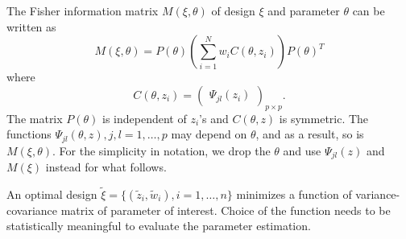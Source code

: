 \documentclass[12pt]{TD-CJS}
\newcommand{\argmin}{\operatornamewithlimits{argmin}}
\begin{document}
The Fisher information matrix $M(\xi,\theta)$ of design $\xi$ and parameter $\theta$ can be written as 
\begin{equation}\label{eq:1}
M(\xi,\theta)  = P(\theta)(\sum_{i=1}^Nw_iC(\theta,z_i))P(\theta)^T
\end{equation}where \begin{equation}\label{eq:2}
C(\theta,z_i) = \left ( \begin{array}{c}
\Psi_{jl}(z_i)
\end{array} \right)_{p\times p}.\end{equation}
The matrix $P(\theta)$ is independent of $z_i$'s and $C(\theta,z)$ is symmetric. The functions $\Psi_{jl}(\theta,z), j,l=1,\ldots,p$ may depend on $\theta$, and as a result, so is $M(\xi,\theta)$. For the simplicity in notation, we drop the $\theta$ and use $\Psi_{jl}(z)$ and $M(\xi)$ instead for what follows. 

An optimal design $\tilde{\xi} = \{(\tilde{z}_i,\tilde{w}_i), i=1,\ldots,n\}$ minimizes a function of variance-covariance matrix of parameter of interest. Choice of the function needs to be statistically meaningful to evaluate the parameter estimation. 
\end{document}
